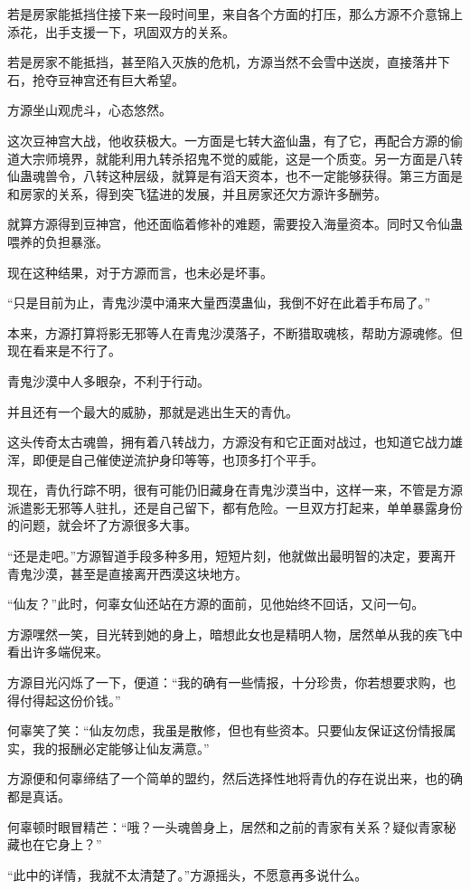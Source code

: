 \begin{this_body}
若是房家能抵挡住接下来一段时间里，来自各个方面的打压，那么方源不介意锦上添花，出手支援一下，巩固双方的关系。

若是房家不能抵挡，甚至陷入灭族的危机，方源当然不会雪中送炭，直接落井下石，抢夺豆神宫还有巨大希望。

方源坐山观虎斗，心态悠然。

这次豆神宫大战，他收获极大。一方面是七转大盗仙蛊，有了它，再配合方源的偷道大宗师境界，就能利用九转杀招鬼不觉的威能，这是一个质变。另一方面是八转仙蛊魂兽令，八转这种层级，就算是有滔天资本，也不一定能够获得。第三方面是和房家的关系，得到突飞猛进的发展，并且房家还欠方源许多酬劳。

就算方源得到豆神宫，他还面临着修补的难题，需要投入海量资本。同时又令仙蛊喂养的负担暴涨。

现在这种结果，对于方源而言，也未必是坏事。

“只是目前为止，青鬼沙漠中涌来大量西漠蛊仙，我倒不好在此着手布局了。”

本来，方源打算将影无邪等人在青鬼沙漠落子，不断猎取魂核，帮助方源魂修。但现在看来是不行了。

青鬼沙漠中人多眼杂，不利于行动。

并且还有一个最大的威胁，那就是逃出生天的青仇。

这头传奇太古魂兽，拥有着八转战力，方源没有和它正面对战过，也知道它战力雄浑，即便是自己催使逆流护身印等等，也顶多打个平手。

现在，青仇行踪不明，很有可能仍旧藏身在青鬼沙漠当中，这样一来，不管是方源派遣影无邪等人驻扎，还是自己留下，都有危险。一旦双方打起来，单单暴露身份的问题，就会坏了方源很多大事。

“还是走吧。”方源智道手段多种多用，短短片刻，他就做出最明智的决定，要离开青鬼沙漠，甚至是直接离开西漠这块地方。

“仙友？”此时，何辜女仙还站在方源的面前，见他始终不回话，又问一句。

方源嘿然一笑，目光转到她的身上，暗想此女也是精明人物，居然单从我的疾飞中看出许多端倪来。

方源目光闪烁了一下，便道：“我的确有一些情报，十分珍贵，你若想要求购，也得付得起这份价钱。”

何辜笑了笑：“仙友勿虑，我虽是散修，但也有些资本。只要仙友保证这份情报属实，我的报酬必定能够让仙友满意。”

方源便和何辜缔结了一个简单的盟约，然后选择性地将青仇的存在说出来，也的确都是真话。

何辜顿时眼冒精芒：“哦？一头魂兽身上，居然和之前的青家有关系？疑似青家秘藏也在它身上？”

“此中的详情，我就不太清楚了。”方源摇头，不愿意再多说什么。


\end{this_body}
